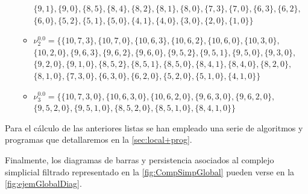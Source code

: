 \documentclass[12pt, a4paper, twoside]{book}
\numberwithin{equation}{section}
\theoremstyle{definition}
\newenvironment{ejem}
  {\pushQED{\qed}\renewcommand{\qedsymbol}{$\blacktriangleleft$}\ejemplo}
  {\popQED\endejemplo}
\theoremstyle{remark}
\theoremstyle{plain}
\begin{document}
\begin{ejem}
\begin{itemize}
\begin{itemize}
						$\{9, 1\},\{9, 0\},\{8, 5\},\{8, 4\},\{8, 2\},\{8, 1\},\{8, 0\},\{7, 3\},\{7, 0\},\{6, 3\},\{6, 2\},$\\
					$\{6, 0\},\{5, 2\},\{5, 1\},\{5, 0\},\{4, 1\},\{4, 0\},\{3, 0\},\{2, 0\},\{1, 0\}\}$
					\item {\Large $\nu$}$^{0.0}_{2}=\{\{10, 7, 3\},\{10, 7, 0\},\{10, 6, 3\},\{10, 6, 2\},\{10, 6, 0\},\{10, 3, 0\},$\\
							$\{10, 2, 0\},\{9, 6, 3\},\{9, 6, 2\},\{9, 6, 0\},\{9, 5, 2\},\{9, 5, 1\},\{9, 5, 0\},\{9, 3, 0\},$\\
							$\{9, 2, 0\},\{9, 1, 0\},\{8, 5, 2\},\{8, 5, 1\},\{8, 5, 0\},\{8, 4, 1\},\{8, 4, 0\},\{8, 2, 0\},$\\
						$\{8, 1, 0\},\{7, 3, 0\},\{6, 3, 0\},\{6, 2, 0\},\{5, 2, 0\},\{5, 1, 0\},\{4, 1, 0\}\}$
					\item {\Large $\nu$}$^{0.0}_{3}=\{\{10, 7, 3, 0\},\{10, 6, 3, 0\},\{10, 6, 2, 0\},\{9, 6, 3, 0\},\{9, 6, 2, 0\},$\\
						$\{9, 5, 2, 0\},\{9, 5, 1, 0\},\{8, 5, 2, 0\},\{8, 5, 1, 0\},\{8, 4, 1, 0\}\}$
				\end{itemize}
		\end{itemize}
	Para el cálculo de las anteriores listas se han empleado una serie de 
	algoritmos y programas que detallaremos en la 
	\autoref{sec:local+prog}.

	Finalmente, los diagramas de barras y persistencia asociados al
	complejo simplicial filtrado representado en 
	la \autoref{fig:CompSimpGlobal} pueden verse en 
	la \autoref{fig:ejemGlobalDiag}.
	

\end{ejem}
\end{document}
